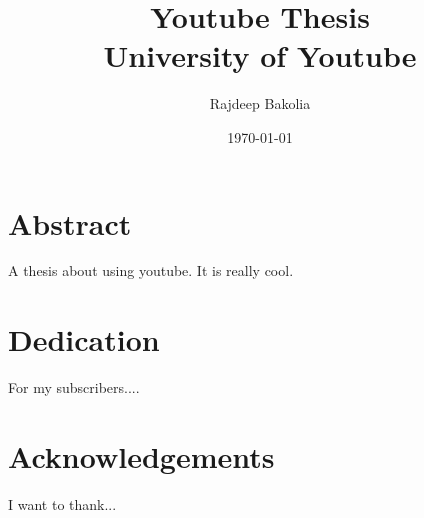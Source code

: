 \documentclass[twoside]{report}
\author{Rajdeep Bakolia}
\title{\Large{Youtube Thesis}\\
\LARGE{University of Youtube}}
\date{\today}
\begin{document}
\maketitle





\chapter*{Abstract}
A thesis about using youtube. It is really cool.

\chapter*{Dedication}
For my subscribers....

\chapter*{Acknowledgements}
I want to thank...



\tableofcontents
\listoffigures %








\appendix




\end{document}
